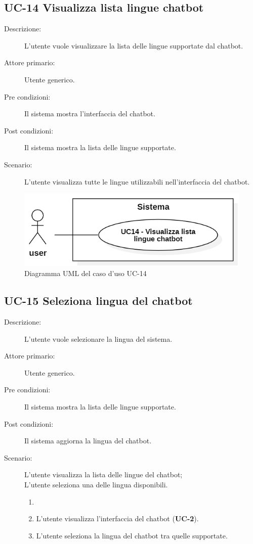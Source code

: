 \subsection{UC-14 Visualizza lista lingue chatbot}
\begin{description}
    \item[Descrizione:] L'utente vuole visualizzare la lista delle lingue supportate dal chatbot.
    \item[Attore primario:] Utente generico.
    \item[Pre condizioni:] Il sistema mostra l'interfaccia del chatbot.
    \item[Post condizioni:] Il sistema mostra la lista delle lingue supportate.
    \item[Scenario:] L'utente visualizza tutte le lingue utilizzabili nell'interfaccia del chatbot.
\end{description}

\begin{figure}[H]
    \centering
    \includegraphics[width=0.8\linewidth]{UC14.png}
    \caption{Diagramma UML del caso d'uso UC-14}
    \label{fig:UC14}
\end{figure}

\subsection{UC-15 Seleziona lingua del chatbot}
\begin{description}
    \item[Descrizione:] L'utente vuole selezionare la lingua del sistema.
    \item[Attore primario:] Utente generico.
    \item[Pre condizioni:] Il sistema mostra la lista delle lingue supportate.
    \item[Post condizioni:] Il sistema aggiorna la lingua del chatbot.
    \item[Scenario:] L'utente visualizza la lista delle lingue del chatbot;\\L'utente seleziona una delle lingua disponibili.
    \begin{enumerate}
        \item[] 
        \item L’utente visualizza l'interfaccia del chatbot (\textbf{UC-2}).
        \item L’utente seleziona la lingua del chatbot tra quelle supportate.
    \end{enumerate}
\end{description}

